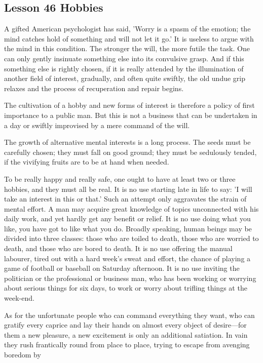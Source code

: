 \documentclass[kindlepaper]{BHCexam4kindle}
\begin{document}
\subsection{Lesson 46
Hobbies}
\par
A gifted American psychologist has said, 'Worry is a spasm of the emotion; the mind catches hold of something
and will not let it go.' It is useless to argue with the mind in this condition. The stronger the will, the more
futile the task. One can only gently insinuate something else into its convulsive grasp. And if this something
else is rightly chosen, if it is really attended by the illumination of another field of interest, gradually, and often
quite swiftly, the old undue grip relaxes and the process of recuperation and repair begins.
\par
The cultivation of a hobby and new forms of interest is therefore a policy of first importance to a public man.
But this is not a business that can be undertaken in a day or swiftly improvised by a mere command of the will.
\par
The growth of alternative mental interests is a long process. The seeds must be carefully chosen; they must fall
on good ground; they must be sedulously tended, if the vivifying fruits are to be at hand when needed.
\par
To be really happy and really safe, one ought to have at least two or three hobbies, and they must all be real. It
is no use starting late in life to say: 'I will take an interest in this or that.' Such an attempt only aggravates the
strain of mental effort. A man may acquire great knowledge of topics unconnected with his daily work, and yet
hardly get any benefit or relief. It is no use doing what you like, you have got to like what you do. Broadly
speaking, human beings may be divided into three classes: those who are toiled to death, those who are
worried to death, and those who are bored to death. It is no use offering the manual labourer, tired out with a
hard week's sweat and effort, the chance of playing a game of football or baseball on Saturday afternoon. It is
no use inviting the politician or the professional or business man, who has been working or worrying about
serious things for six days, to work or worry about trifling things at the week-end.
\par
As for the unfortunate people who can command everything they want, who can gratify every caprice and lay
their hands on almost every object of desire—for them a new pleasure, a new excitement is only an additional
satiation. In vain they rush frantically round from place to place, trying to escape from avenging boredom by
\end{document}
